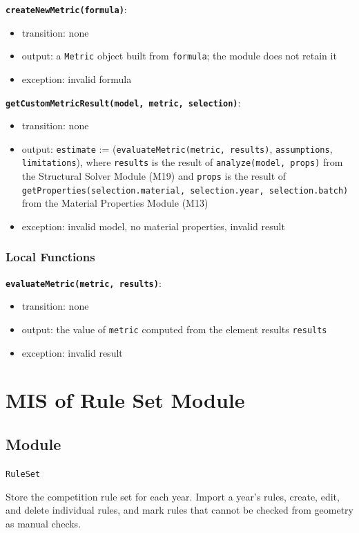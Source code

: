 \documentclass[12pt, titlepage]{article}
\begin{document}
\textbf{\texttt{createNewMetric(formula)}}:
\begin{itemize}
  \item transition: none
  \item output: a \texttt{Metric} object built from \texttt{formula}; the module does not retain it
  \item exception: invalid formula
\end{itemize}

\textbf{\texttt{getCustomMetricResult(model, metric, selection)}}:
\begin{itemize}
  \item transition: none
  \item output: \texttt{estimate} := (\texttt{evaluateMetric(metric, results)}, \texttt{assumptions}, \texttt{limitations}), where \texttt{results} is the result of \texttt{analyze(model, props)} from the Structural Solver Module (M19) and \texttt{props} is the result of \texttt{getProperties(selection.material, selection.year, selection.batch)} from the Material Properties Module (M13)
  \item exception: invalid model, no material properties, invalid result
\end{itemize}

\subsubsection{Local Functions}

\textbf{\texttt{evaluateMetric(metric, results)}}:
\begin{itemize}
  \item transition: none
  \item output: the value of \texttt{metric} computed from the element results \texttt{results}
  \item exception: invalid result
\end{itemize}

\newpage

\section{MIS of Rule Set Module} \label{mRuleSet}

\subsection{Module}
\texttt{RuleSet}

Store the competition rule set for each year. Import a year's rules, create, edit, and delete individual rules, and mark rules that cannot be checked from geometry as manual checks.
\end{document}
